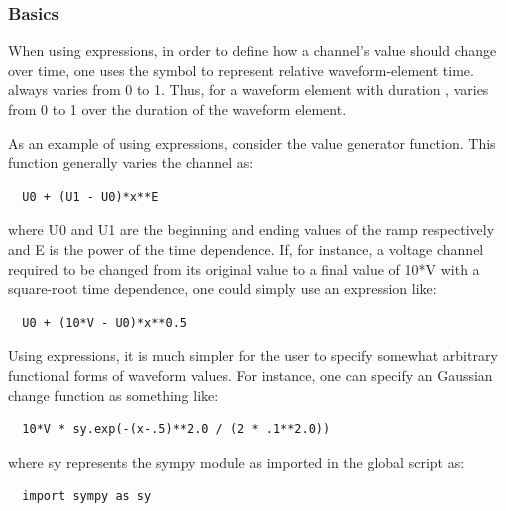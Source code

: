 \subsubsection{Basics}

When using expressions, in
order to define how a channel's value should change over time, one uses the
symbol  to represent relative waveform-element time.
 always varies
from 0 to 1.  Thus, for a waveform element with duration ,
 varies from 0 to 1
over the duration of the waveform element.

As an example of using expressions, consider the  value generator
function.  This function generally varies the channel as:
%
\begin{lstlisting}
  U0 + (U1 - U0)*x**E
\end{lstlisting}
%
where U0 and U1 are the beginning and ending values of the ramp respectively and
E is the power of the time dependence.  If, for instance, a voltage channel
required to be changed from its original value to a final value of 10*V with a
square-root time dependence, one could simply use an expression like:
%
\begin{lstlisting}
  U0 + (10*V - U0)*x**0.5
\end{lstlisting}
%
Using expressions, it is much simpler for the user to specify somewhat arbitrary
functional forms of waveform values.  For instance, one can specify an Gaussian
change function as something like:
%
\begin{lstlisting}
  10*V * sy.exp(-(x-.5)**2.0 / (2 * .1**2.0))
\end{lstlisting}
%
where sy represents the sympy module as imported in the global script as:
\begin{lstlisting}
  import sympy as sy
\end{lstlisting}

